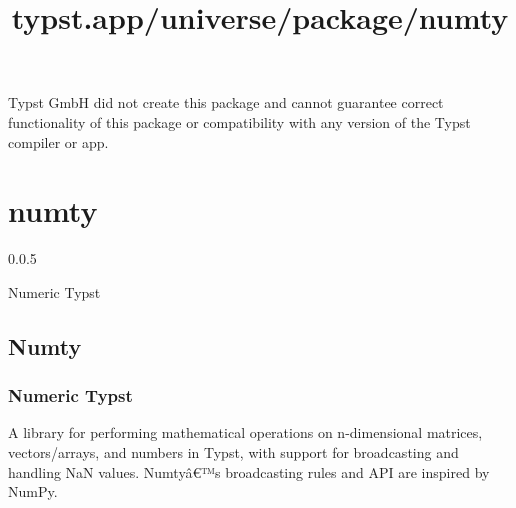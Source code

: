 Typst GmbH did not create this package and cannot guarantee correct
functionality of this package or compatibility with any version of the
Typst compiler or app.


\title{typst.app/universe/package/numty}

\label{banner}
\section{numty}\label{numty}

{ 0.0.5 }

Numeric Typst

\label{readme}
\subsection{Numty}\label{numty-1}

\subsubsection{Numeric Typst}\label{numeric-typst}

A library for performing mathematical operations on n-dimensional
matrices, vectors/arrays, and numbers in Typst, with support for
broadcasting and handling NaN values. Numtyâ€™s broadcasting rules and
API are inspired by NumPy.

